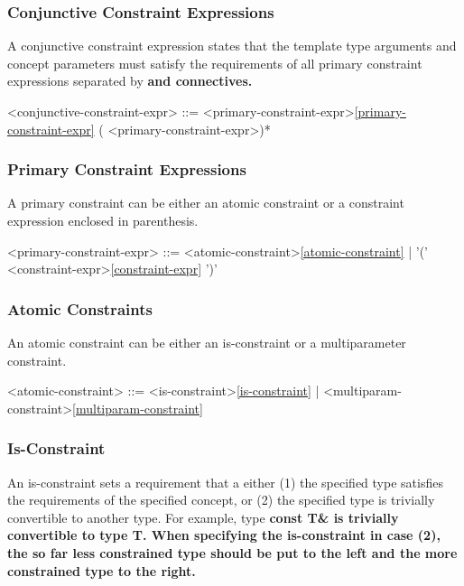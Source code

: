 \documentclass[a4paper,oneside,11pt]{article}
\begin{document}
\subsubsection{Conjunctive Constraint Expressions}

A conjunctive constraint expression states that the template type arguments and concept parameters must satisfy
the requirements of all primary constraint expressions separated by \bf{and} connectives.

\begin{grammar}
\label{conjunctive-constraint-expr}<conjunctive-constraint-expr> ::= <primary-constraint-expr>\ref{primary-constraint-expr} ( <primary-constraint-expr>)*
\end{grammar}

\subsubsection{Primary Constraint Expressions}

A primary constraint can be either an atomic constraint or a constraint expression enclosed in parenthesis.

\begin{grammar}
\label{primary-constraint-expr}<primary-constraint-expr> ::= <atomic-constraint>\ref{atomic-constraint} | '(' <constraint-expr>\ref{constraint-expr} ')'
\end{grammar}

\subsubsection{Atomic Constraints}

An atomic constraint can be either an is-constraint or a multiparameter constraint.

\begin{grammar}
\label{atomic-constraint}<atomic-constraint> ::= <is-constraint>\ref{is-constraint} | <multiparam-constraint>\ref{multiparam-constraint}
\end{grammar}

\subsubsection{Is-Constraint}

An is-constraint sets a requirement that a either (1) the specified type satisfies the requirements of the specified concept, or (2) the specified type is trivially convertible to another type. For example, type \bf{const T\&} is trivially convertible to type \bf{T}.
When specifying the is-constraint in case (2), the so far less constrained type should be put to the left and the more constrained type to the right.
\end{document}
